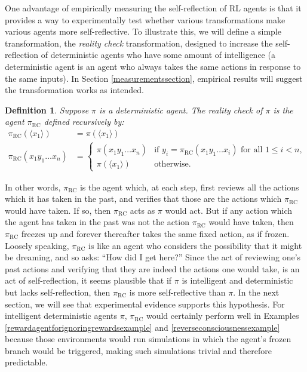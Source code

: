 \documentclass{article}
\newtheorem{definition}[mytheorem]{Definition}
\def\RC{\textrm{RC}}
\begin{document}
One advantage of empirically measuring the self-reflection of RL agents is that it
provides a way to experimentally test whether various transformations make various
agents more self-reflective. To illustrate this, we will define a simple transformation,
the \emph{reality check} transformation, designed to increase the self-reflection
of deterministic agents who have some amount of intelligence
(a deterministic agent is an agent who always takes the same
actions in response to the same inputs).
In Section \ref{measurementssection}, empirical results will suggest
the transformation works as intended.

\begin{definition}
\label{realitycheckdefn}
  Suppose $\pi$ is a deterministic agent. The \emph{reality check} of $\pi$ is the agent
  $\pi_{\RC}$ defined recursively by:
  \begin{align*}
    \pi_{\RC}(\langle x_1\rangle) &= \pi(\langle x_1\rangle)\\
    \pi_{\RC}(x_1y_1\ldots x_n) &=
    \begin{cases}
      \pi(x_1y_1\ldots x_n) & \mbox{if $y_i=\pi_{\RC}(x_1y_1\ldots x_i)$ for all $1\leq i<n$,}\\
      \pi(\langle x_1\rangle) & \mbox{otherwise.}
    \end{cases}
  \end{align*}
\end{definition}

In other words, $\pi_{\RC}$ is the agent which, at each step, first reviews all the actions
which it has taken in the past, and verifies that those are the actions which $\pi_{\RC}$ would
have taken. If so, then $\pi_{\RC}$ acts as $\pi$ would act. But if any action which
the agent has taken in the past was not the action $\pi_{\RC}$ would have taken, then
$\pi_{\RC}$ freezes up and forever thereafter takes the same fixed action, as if frozen.
Loosely speaking, $\pi_{\RC}$ is like an agent who considers the possibility that it might
be dreaming, and so asks: ``How did I get here?''
Since the act of reviewing one's past actions and verifying that they are indeed the actions
one would take, is an act of self-reflection, it seems plausible that if $\pi$
is intelligent and deterministic but lacks self-reflection, then $\pi_{\RC}$ is
more self-reflective than $\pi$. In the next section, we will see that experimental
evidence supports this hypothesis.
For intelligent deterministic agents $\pi$, $\pi_{\RC}$ would certainly perform well in
Examples \ref{rewardagentforignoringrewardsexample} and
\ref{reverseconsciousnessexample} because those environments would
run simulations in which the agent's frozen branch would be triggered,
making such simulations trivial and therefore predictable.
\end{document}
